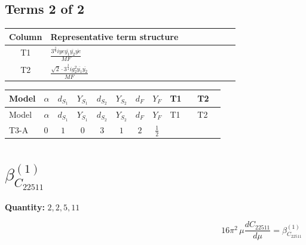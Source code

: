 \documentclass[8pt]{article}
\begin{document}
\begin{landscape}
\subsection*{Terms 2 of 2}
\begin{center}
\begin{tabular}{@{}c >{\raggedright\arraybackslash}p{0.82\linewidth}@{}}
\toprule
Column & Representative term structure \\
\midrule
T1 & \(\displaystyle \frac{3^{\frac{3}{4}} i ye \overline{y_{1}} \overline{y_{2}} \overline{ye}}{MF}\) \\
\midrule
T2 & \(\displaystyle \frac{\sqrt{2} \cdot 3^{\frac{3}{4}} i g_{2}^{2} \overline{y_{1}} \overline{y_{2}}}{MF}\) \\
\midrule
\bottomrule
\end{tabular}
\end{center}
\smallskip
\tiny
\begin{longtable}{@{}llcccccc >{\raggedright\arraybackslash}p{0.21\linewidth} >{\raggedright\arraybackslash}p{0.21\linewidth}@{}}
\toprule
Model & $\alpha$ & $d_{S_1}$ & $Y_{S_1}$ & $d_{S_2}$ & $Y_{S_2}$ & $d_F$ & $Y_F$ & T1 & T2 \\
\midrule
\endfirsthead
\toprule
Model & $\alpha$ & $d_{S_1}$ & $Y_{S_1}$ & $d_{S_2}$ & $Y_{S_2}$ & $d_F$ & $Y_F$ & T1 & T2 \\
\midrule
\endhead
T3-A & $0$ & $1$ & $0$ & $3$ & $1$ & $2$ & $\frac{1}{2}$ & \scriptsize\adjustbox{max width=\linewidth}{$\begin{gathered} - \frac{3^{\frac{3}{4}} i ye \overline{y_{1}} \overline{y_{2}} \overline{ye}}{12 MF}\end{gathered}$} & \scriptsize\adjustbox{max width=\linewidth}{$\begin{gathered} \frac{\sqrt{2} \cdot 3^{\frac{3}{4}} i g_{2}^{2} \overline{y_{1}} \overline{y_{2}}}{3 MF}\end{gathered}$} \\
\midrule
\bottomrule
\end{longtable}
\clearpage
\section*{$\beta_{C_{22511}}^{(1)}$}
\noindent\textbf{Quantity: }$\mathrm{2,2,5,11}$\par\smallskip
\[16\pi^2\,\mu\frac{d C_{22511}}{d\mu}=\beta_{C_{22511}}^{(1)}\]

\end{landscape}
\end{document}
